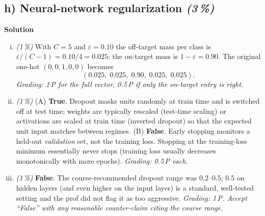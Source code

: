 \documentclass[11pt,a4paper]{article}
\newcommand{\subpoints}[1]{\textit{(#1\,\%)}}
\newcommand{\sol}{\noindent\textbf{Solution}}
\begin{document}
\subsection*{h) Neural-network regularization \subpoints{3}}
\sol{}
\begin{enumerate}[(i)]
  \item \subpoints{1} With $C = 5$ and $\varepsilon = 0.10$ the off-target mass per class is
        $\varepsilon/(C-1) = 0.10/4 = 0.025$; the on-target mass is $1 - \varepsilon = 0.90$.
        The original one-hot $(0,0,1,0,0)$ becomes
        $$\boxed{(0.025,\; 0.025,\; 0.90,\; 0.025,\; 0.025)}.$$
        \emph{Grading: 1\,P for the full vector, 0.5\,P if only the on-target entry is right.}

  \item \subpoints{1} (A) \textbf{True}. Dropout masks units randomly at train time and is
        switched off at test time; weights are typically rescaled (test-time scaling) or
        activations are scaled at train time (inverted dropout) so that the expected unit
        input matches between regimes.
        (B) \textbf{False}. Early stopping monitors a held-out \emph{validation} set, not the
        training loss. Stopping at the training-loss minimum essentially never stops (training
        loss usually decreases monotonically with more epochs).
        \emph{Grading: 0.5\,P each.}

  \item \subpoints{1} \textbf{False}. The course-recommended dropout range was $0.2$--$0.5$;
        $0.5$ on hidden layers (and even higher on the input layer) is a standard, well-tested
        setting and the prof did not flag it as too aggressive.
        \emph{Grading: 1\,P. Accept ``False'' with any reasonable counter-claim citing the course range.}
\end{enumerate}
\end{document}
